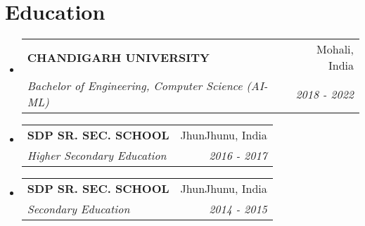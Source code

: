 \documentclass[letterpaper,11pt]{article}
\makeatletter
\newcommand{\resumeItem}[1]{
  \item\small{
    {#1 \vspace{-2pt}}
  }
}
\newcommand{\resumeSubheading}[4]{
  \vspace{-2pt}\item
    \begin{tabular*}{0.97\textwidth}[t]{l@{\extracolsep{\fill}}r}
      \textbf{#1} & #2 \\
      \textit{\small#3} & \textit{\small #4} \\
    \end{tabular*}\vspace{-7pt}
}
\newcommand{\resumeProjectHeading}[2]{
    \item
    \begin{tabular*}{0.97\textwidth}{l@{\extracolsep{\fill}}r}
      \small#1 & #2 \\
    \end{tabular*}\vspace{-7pt}
}
\newcommand{\resumeSubHeadingListStart}{\begin{itemize}[leftmargin=0.15in, label={}]}
\newcommand{\resumeSubHeadingListEnd}{\end{itemize}}
\newcommand{\resumeItemListStart}{\begin{itemize}}
\newcommand{\resumeItemListEnd}{\end{itemize}\vspace{-5pt}}
\makeatother
\begin{document}

\section{Education}
  \resumeSubHeadingListStart
    \resumeSubheading
      {CHANDIGARH UNIVERSITY}{Mohali, India}
      {Bachelor of Engineering, Computer Science (AI-ML)}{2018 - 2022}
  \resumeSubHeadingListEnd
  \resumeSubHeadingListStart
    \resumeSubheading
      {SDP SR. SEC. SCHOOL}{JhunJhunu, India}
      {Higher Secondary Education}{2016 - 2017}
  \resumeSubHeadingListEnd
  \resumeSubHeadingListStart
    \resumeSubheading
      {SDP SR. SEC. SCHOOL}{JhunJhunu, India}
      {Secondary Education}{2014 - 2015}
  \resumeSubHeadingListEnd

\end{document}
